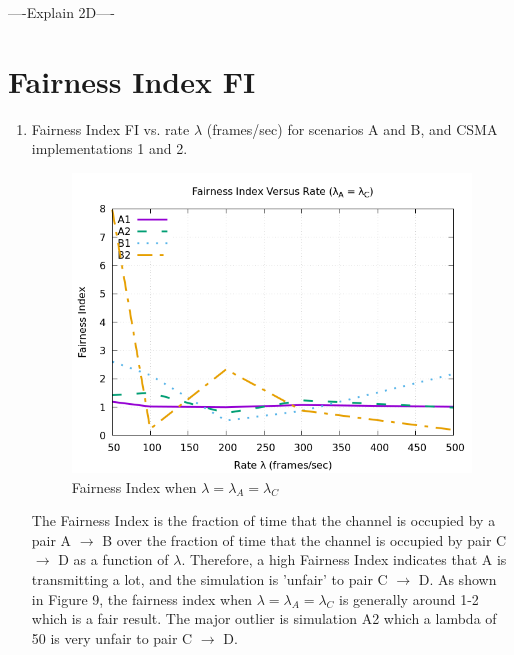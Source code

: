 \documentclass[12pt]{article}
\begin{document}
\begin{enumerate}
{            ----Explain 2D----
        }        
    
    
    \end{enumerate}
    
    
\clearpage
    \section{Fairness Index FI}

    \begin{enumerate}
    
        \item {
            Fairness Index FI vs. rate \(\lambda{}\) (frames/sec) for scenarios A and B, and CSMA implementations 1 and 2.
            
            \begin{figure}[!htb]
                \centering
                \includegraphics[width=5in]{3A.png}
                \caption{Fairness Index when \(\lambda{} = \lambda{}_A = \lambda{}_C\) }
                \label{fig:3A}
            \end{figure}

            The Fairness Index is the fraction of time that the channel is occupied by a pair A \(\rightarrow\) B over the fraction of time that the channel is occupied by pair C \(\rightarrow\) D as a function of \(\lambda\). Therefore, a high Fairness Index indicates that A is transmitting a lot, and the simulation is 'unfair' to pair C \(\rightarrow\) D. As shown in Figure 9, the fairness index when \(\lambda{} = \lambda{}_A = \lambda{}_C\) is generally around 1-2 which is a fair result. The major outlier is simulation A2 which a lambda of 50 is very unfair to pair C \(\rightarrow\) D.
        }    
    

\end{enumerate}
\end{document}
